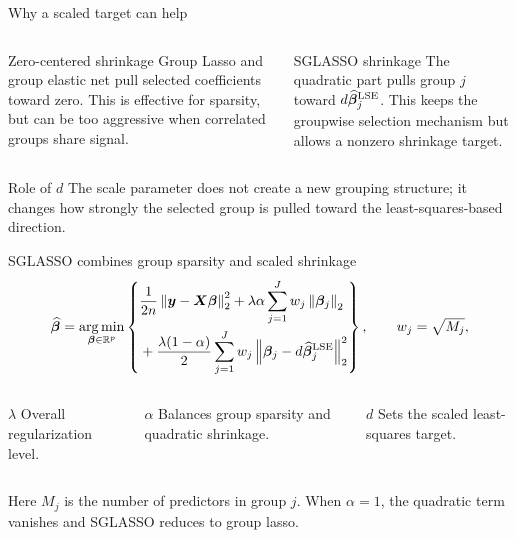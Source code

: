 \documentclass[newPxFont,nosectionpage]{beamer}
\newcommand{\bbeta}{\bm{\beta}}
\newcommand{\bX}{\bm{X}}
\newcommand{\by}{\bm{y}}
\newcommand{\norm}[1]{\left\lVert #1 \right\rVert}
\newcommand{\argmin}{\operatorname*{arg\,min}}
\begin{document}
\begin{frame}{Why a scaled target can help}
\small
\begin{columns}[T,onlytextwidth]
\begin{block}{Zero-centered shrinkage}
Group Lasso and group elastic net pull selected coefficients toward zero. This is effective for sparsity, but can be too aggressive when correlated groups share signal.
\end{block}
\begin{block}{SGLASSO shrinkage}
The quadratic part pulls group $j$ toward $d\widehat{\bbeta}^{\rm LSE}_j$. This keeps the groupwise selection mechanism but allows a nonzero shrinkage target.
\end{block}
\end{columns}
\vspace{0.45em}
\begin{alertblock}{Role of $d$}
The scale parameter does not create a new grouping structure; it changes how strongly the selected group is pulled toward the least-squares-based direction.
\end{alertblock}
\end{frame}

\begin{frame}{SGLASSO combines group sparsity and scaled shrinkage}
\small
\[
\widehat{\bbeta} = \argmin_{\bbeta\in\mathbb{R}^p}
\left\{\begin{aligned}
&\frac{1}{2n}\norm{\by-\bX\bbeta}_2^2
+ \lambda\alpha\sum_{j=1}^{J} w_j\norm{\bbeta_j}_2\\
&+\frac{\lambda(1-\alpha)}{2}\sum_{j=1}^{J}w_j
\norm{\bbeta_j-d\widehat{\bbeta}^{\rm LSE}_j}_2^2
\end{aligned}\right\},
\qquad w_j=\sqrt{M_j},
\]

\begin{columns}[T,onlytextwidth]
\begin{block}{$\lambda$}
Overall regularization level.
\end{block}
\begin{block}{$\alpha$}
Balances group sparsity and quadratic shrinkage.
\end{block}
\begin{block}{$d$}
Sets the scaled least-squares target.
\end{block}
\end{columns}

\vspace{0.25em}
\small Here $M_j$ is the number of predictors in group $j$. When $\alpha=1$, the quadratic term vanishes and SGLASSO reduces to group lasso.
\end{frame}
\end{document}
